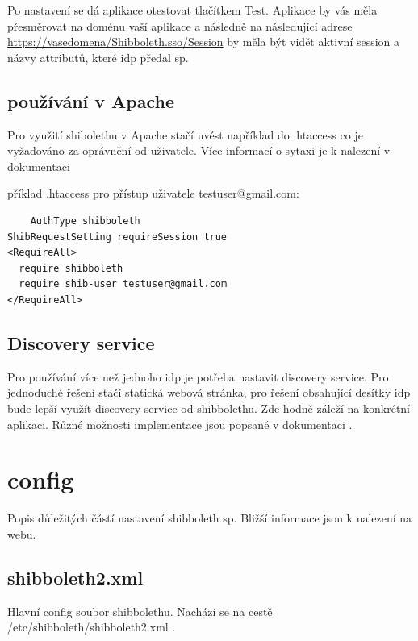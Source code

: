 Po nastavení se dá aplikace otestovat tlačítkem Test. Aplikace by vás měla přesměrovat na doménu vaší aplikace a následně na následující adrese \url{https://vasedomena/Shibboleth.sso/Session} by měla být vidět aktivní session a názvy attributů, které idp předal sp.

\section{používání v Apache}

Pro využití shibolethu v Apache stačí uvést například do .htaccess co je vyžadováno za oprávnění od uživatele. Více informací o sytaxi je k nalezení v dokumentaci\cite{SPApache}\cite{SPhtaccess} \linebreak

příklad .htaccess pro přístup uživatele testuser@gmail.com:

 \begin{lstlisting}
    AuthType shibboleth
ShibRequestSetting requireSession true
<RequireAll>
  require shibboleth
  require shib-user testuser@gmail.com
</RequireAll>
    \end{lstlisting}


\section{Discovery service}
Pro používání více než jednoho idp je potřeba nastavit discovery service. Pro jednoduché řešení stačí statická webová stránka, pro řešení obsahující desítky idp bude lepší využít discovery service od shibbolethu. Zde hodně záleží na konkrétní aplikaci. Různé možnosti implementace jsou popsané v dokumentaci \cite{IdPDiscovery}. 
\chapter{config}
Popis důležitých částí nastavení shibboleth sp. Bližší informace jsou k nalezení na webu\cite{SPconfig}. 

\section{shibboleth2.xml}
Hlavní config soubor shibbolethu. Nachází se na cestě /etc/shibboleth/shibboleth2.xml .

